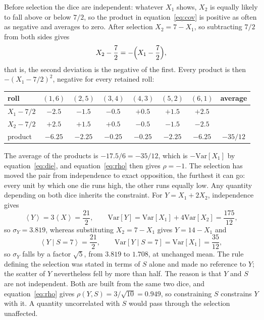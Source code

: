 \documentclass[12pt]{article}
\newcommand{\avg}[1]{\left\langle #1 \right\rangle}
\newcommand{\Var}{\mathrm{Var}}
\begin{document}
Before selection the dice are independent: whatever $X_1$ shows, $X_2$ is
equally likely to fall above or below $7/2$, so the product in
equation~\eqref{eq:cov} is positive as often as negative and averages to zero.
After selection $X_2 = 7 - X_1$, so subtracting $7/2$ from both sides gives
\begin{equation}
  X_2 - \frac{7}{2} = -\Bigl(X_1 - \frac{7}{2}\Bigr),
\end{equation}
that is, the second deviation is the negative of the first.  Every product is
then $-(X_1 - 7/2)^2$, negative for every retained roll:
\begin{center}
\begin{tabular}{lccccccc}
  \toprule
  roll & $(1,6)$ & $(2,5)$ & $(3,4)$ & $(4,3)$ & $(5,2)$ & $(6,1)$ & average\\
  \midrule
  $X_1 - 7/2$ & $-2.5$ & $-1.5$ & $-0.5$ & $+0.5$ & $+1.5$ & $+2.5$ & \\
  $X_2 - 7/2$ & $+2.5$ & $+1.5$ & $+0.5$ & $-0.5$ & $-1.5$ & $-2.5$ & \\
  product     & $-6.25$ & $-2.25$ & $-0.25$ & $-0.25$ & $-2.25$ & $-6.25$
              & $-35/12$\\
  \bottomrule
\end{tabular}
\end{center}
The average of the products is $-17.5/6 = -35/12$, which is $-\Var[X_1]$ by
equation~\eqref{eq:die}, and equation~\eqref{eq:rho} then gives $\rho = -1$.
The selection has moved the pair from independence to exact opposition, the
furthest it can go: every unit by which one die runs high, the other runs
equally low.  Any quantity depending on both dice inherits the constraint.  For $Y = X_1 + 2X_2$, independence gives
\begin{equation}
  \avg{Y} = 3\avg{X} = \frac{21}{2}, \qquad
  \Var[Y] = \Var[X_1] + 4\Var[X_2] = \frac{175}{12},
\end{equation}
so $\sigma_Y = 3.819$, whereas substituting $X_2 = 7 - X_1$ gives $Y = 14 -
X_1$ and
\begin{equation}
  \avg{Y \mid S = 7} = \frac{21}{2}, \qquad
  \Var[Y \mid S = 7] = \Var[X_1] = \frac{35}{12},
\end{equation}
so $\sigma_Y$ falls by a factor $\sqrt{5}$, from $3.819$ to $1.708$, at
unchanged mean.  The rule defining the selection was stated in terms of $S$
alone and made no reference to $Y$; the scatter of $Y$ nevertheless fell by more
than half.  The reason is that $Y$ and $S$ are not independent.  Both are built
from the same two dice, and equation~\eqref{eq:rho} gives
$\rho(Y, S) = 3/\sqrt{10} = 0.949$, so constraining $S$ constrains $Y$ with it.
A quantity uncorrelated with $S$ would pass through the selection unaffected.
\end{document}
